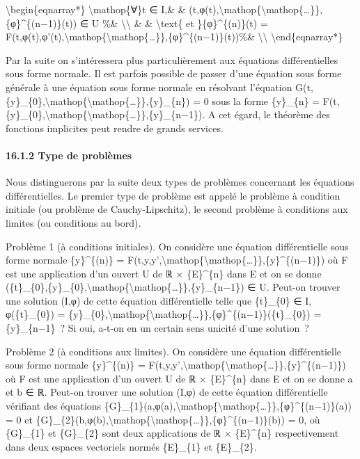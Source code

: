 \documentclass[]{article}
\begin{document}
\textbackslash{}begin\{eqnarray*\} \textbackslash{}mathop\{∀\}t ∈ I,\&
\&
(t,φ(t),\textbackslash{}mathop\{\textbackslash{}mathop\{\ldots{}\}\},\{φ\}\^{}\{(n−1)\}(t))
∈ U \%\& \textbackslash{}\textbackslash{} \& \& \textbackslash{}text\{
et \}\{φ\}\^{}\{(n)\}(t) =
F(t,φ(t),φ'(t),\textbackslash{}mathop\{\textbackslash{}mathop\{\ldots{}\}\},\{φ\}\^{}\{(n−1)\}(t))\%\&
\textbackslash{}\textbackslash{} \textbackslash{}end\{eqnarray*\}

Par la suite on s'intéressera plus particulièrement aux équations
différentielles sous forme normale. Il est parfois possible de passer
d'une équation sous forme générale à une équation sous forme normale en
résolvant l'équation
G(t,\{y\}\_\{0\},\textbackslash{}mathop\{\textbackslash{}mathop\{\ldots{}\}\},\{y\}\_\{n\})
= 0 sous la forme \{y\}\_\{n\} =
F(t,\{y\}\_\{0\},\textbackslash{}mathop\{\textbackslash{}mathop\{\ldots{}\}\},\{y\}\_\{n−1\}).
A cet égard, le théorème des fonctions implicites peut rendre de grands
services.

\paragraph{16.1.2 Type de problèmes}

Nous distinguerons par la suite deux types de problèmes concernant les
équations différentielles. Le premier type de problème est appelé le
problème à condition initiale (ou problème de Cauchy-Lipschitz), le
second problème à conditions aux limites (ou conditions au bord).

Problème 1 (à conditions initiales). On considère une équation
différentielle sous forme normale \{y\}\^{}\{(n)\} =
F(t,y,y',\textbackslash{}mathop\{\textbackslash{}mathop\{\ldots{}\}\},\{y\}\^{}\{(n−1)\})
où F est une application d'un ouvert U de ℝ × \{E\}\^{}\{n\} dans E et
on se donne
(\{t\}\_\{0\},\{y\}\_\{0\},\textbackslash{}mathop\{\textbackslash{}mathop\{\ldots{}\}\},\{y\}\_\{n−1\})
∈ U. Peut-on trouver une solution (I,φ) de cette équation différentielle
telle que \{t\}\_\{0\} ∈ I, φ(\{t\}\_\{0\}) =
\{y\}\_\{0\},\textbackslash{}mathop\{\textbackslash{}mathop\{\ldots{}\}\},\{φ\}\^{}\{(n−1)\}(\{t\}\_\{0\})
= \{y\}\_\{n−1\}~? Si oui, a-t-on en un certain sens unicité d'une
solution~?

Problème 2 (à conditions aux limites). On considère une équation
différentielle sous forme normale \{y\}\^{}\{(n)\} =
F(t,y,y',\textbackslash{}mathop\{\textbackslash{}mathop\{\ldots{}\}\},\{y\}\^{}\{(n−1)\})
où F est une application d'un ouvert U de ℝ × \{E\}\^{}\{n\} dans E et
on se donne a et b ∈ ℝ. Peut-on trouver une solution (I,φ) de cette
équation différentielle vérifiant des équations
\{G\}\_\{1\}(a,φ(a),\textbackslash{}mathop\{\textbackslash{}mathop\{\ldots{}\}\},\{φ\}\^{}\{(n−1)\}(a))
= 0 et
\{G\}\_\{2\}(b,φ(b),\textbackslash{}mathop\{\textbackslash{}mathop\{\ldots{}\}\},\{φ\}\^{}\{(n−1)\}(b))
= 0, où \{G\}\_\{1\} et \{G\}\_\{2\} sont deux applications de ℝ ×
\{E\}\^{}\{n\} respectivement dans deux espaces vectoriels normés
\{E\}\_\{1\} et \{E\}\_\{2\}.
\end{document}
